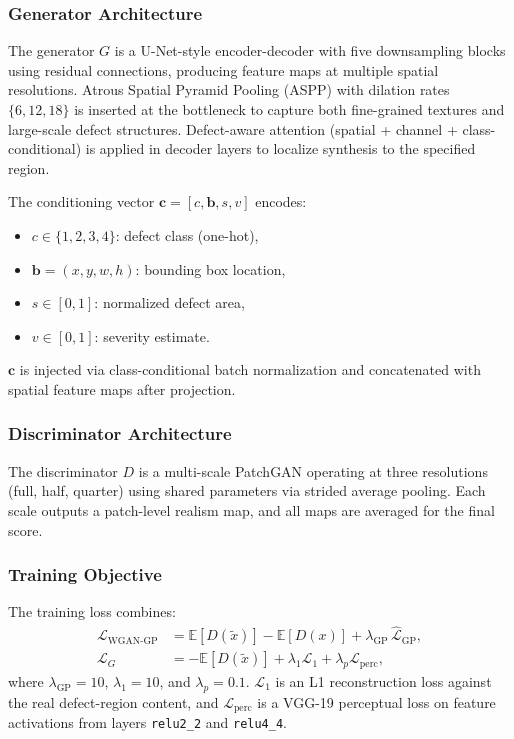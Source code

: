 \documentclass[conference]{IEEEtran}
\begin{document}
\subsubsection{Generator Architecture}
The generator $G$ is a U-Net-style encoder-decoder with five
downsampling blocks using residual connections, producing feature maps
at multiple spatial resolutions. Atrous Spatial Pyramid Pooling (ASPP)
with dilation rates $\{6, 12, 18\}$ is inserted at the bottleneck
to capture both fine-grained textures and large-scale defect structures.
Defect-aware attention (spatial + channel + class-conditional) is
applied in decoder layers to localize synthesis to the specified region.

The conditioning vector $\mathbf{c} = [c, \mathbf{b}, s, v]$ encodes:
\begin{itemize}
    \item $c \in \{1,2,3,4\}$: defect class (one-hot),
    \item $\mathbf{b} = (x,y,w,h)$: bounding box location,
    \item $s \in [0,1]$: normalized defect area,
    \item $v \in [0,1]$: severity estimate.
\end{itemize}
$\mathbf{c}$ is injected via class-conditional batch normalization and
concatenated with spatial feature maps after projection.

\subsubsection{Discriminator Architecture}
The discriminator $D$ is a multi-scale PatchGAN operating at three
resolutions (full, half, quarter) using shared parameters via strided
average pooling. Each scale outputs a patch-level realism map, and all
maps are averaged for the final score.

\subsubsection{Training Objective}
The training loss combines:
\begin{align}
    \mathcal{L}_{\text{WGAN-GP}} &= \mathbb{E}[D(\tilde{x})] -
    \mathbb{E}[D(x)] + \lambda_{\text{GP}}\,\hat{\mathcal{L}}_{\text{GP}},
    \label{eq:wgan} \\
    \mathcal{L}_G &= -\mathbb{E}[D(\tilde{x})] + \lambda_1\mathcal{L}_1
    + \lambda_p\mathcal{L}_{\text{perc}},
    \label{eq:gen_loss}
\end{align}
where $\lambda_{\text{GP}}=10$, $\lambda_1=10$, and
$\lambda_p=0.1$. $\mathcal{L}_1$ is an L1 reconstruction loss against
the real defect-region content, and $\mathcal{L}_{\text{perc}}$ is a
VGG-19 perceptual loss on feature activations from layers
\texttt{relu2\_2} and \texttt{relu4\_4}.
\end{document}
